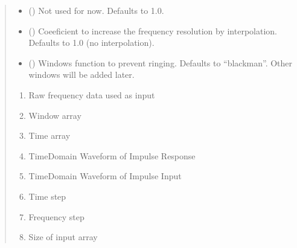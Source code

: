 \documentclass[letterpaper,10pt,english]{sphinxmanual}
\begin{document}
\begin{fulllineitems}
\begin{fulllineitems}
\begin{quote}
\begin{description}
\begin{itemize}
\item {} 
\sphinxAtStartPar
{} (\sphinxstyleliteralemphasis{\sphinxupquote{, }}) \textendash{} Not used for now. Defaults to 1.0.

\item {} 
\sphinxAtStartPar
{} (\sphinxstyleliteralemphasis{\sphinxupquote{, }}) \textendash{} Coeeficient to increase the frequency resolution by interpolation. Defaults to 1.0 (no interpolation).

\item {} 
\sphinxAtStartPar
{} (\sphinxstyleliteralemphasis{\sphinxupquote{, }}) \textendash{} Windows function to prevent ringing. Defaults to “blackman”. Other windows will be added later.

\end{itemize}

\sphinxAtStartPar
\begin{description}
\begin{enumerate}
%
\item {} 
\sphinxAtStartPar
Raw frequency data used as input

\item {} 
\sphinxAtStartPar
Window array

\item {} 
\sphinxAtStartPar
Time array

\item {} 
\sphinxAtStartPar
Time\sphinxhyphen{}Domain Waveform of Impulse Response

\item {} 
\sphinxAtStartPar
Time\sphinxhyphen{}Domain Waveform of Impulse Input

\item {} 
\sphinxAtStartPar
Time step

\item {} 
\sphinxAtStartPar
Frequency step

\item {} 
\sphinxAtStartPar
Size of input array


\end{enumerate}
\end{description}
\end{description}
\end{quote}
\end{fulllineitems}
\end{fulllineitems}
\end{document}
